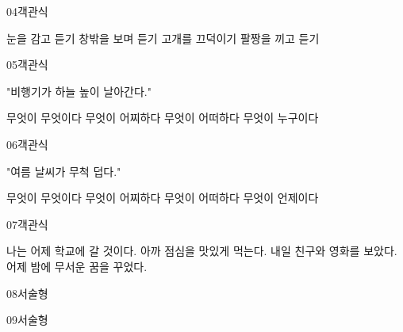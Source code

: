 \documentclass[fs12,seriesSau]{korfarm-base}
\begin{document}
\begin{kfQBlock}{04}{객관식}
\begin{kfChoices}
\kfChoice 눈을 감고 듣기
\kfChoice 창밖을 보며 듣기
\kfChoice 고개를 끄덕이기
\kfChoice 팔짱을 끼고 듣기
\end{kfChoices}
\end{kfQBlock}

\begin{kfQBlock}{05}{객관식}
\begin{kfEvidence}"비행기가 하늘 높이 날아간다."\end{kfEvidence}
\begin{kfChoices}
\kfChoice 무엇이 무엇이다
\kfChoice 무엇이 어찌하다
\kfChoice 무엇이 어떠하다
\kfChoice 무엇이 누구이다
\end{kfChoices}
\end{kfQBlock}

\begin{kfQBlock}{06}{객관식}
\begin{kfEvidence}"여름 날씨가 무척 덥다."\end{kfEvidence}
\begin{kfChoices}
\kfChoice 무엇이 무엇이다
\kfChoice 무엇이 어찌하다
\kfChoice 무엇이 어떠하다
\kfChoice 무엇이 언제이다
\end{kfChoices}
\end{kfQBlock}

\begin{kfQBlock}{07}{객관식}
\begin{kfChoices}
\kfChoice 나는 어제 학교에 갈 것이다.
\kfChoice 아까 점심을 맛있게 먹는다.
\kfChoice 내일 친구와 영화를 보았다.
\kfChoice 어제 밤에 무서운 꿈을 꾸었다.
\end{kfChoices}
\end{kfQBlock}

\begin{kfQBlock}{08}{서술형}
\end{kfQBlock}

\begin{kfQBlock}{09}{서술형}
\end{kfQBlock}
\end{document}
